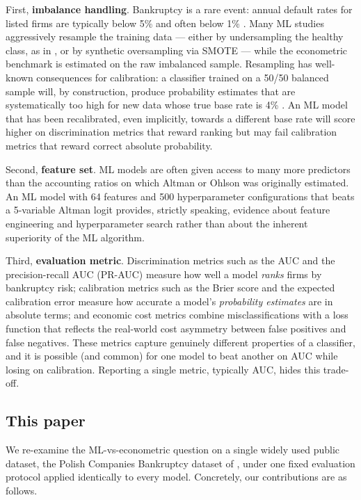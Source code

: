 \documentclass[11pt,a4paper]{article}
\begin{document}
First, \textbf{imbalance handling}. Bankruptcy is a rare event: annual
default rates for listed firms are typically below 5\% and often below 1\%
\citep{shumway2001}. Many ML studies aggressively resample the training data
--- either by undersampling the healthy class, as in \cite{pellegrino2022}, or
by synthetic oversampling via SMOTE \citep{chawla2002} --- while the
econometric benchmark is estimated on the raw imbalanced sample. Resampling
has well-known consequences for calibration: a classifier trained on a
50/50 balanced sample will, by construction, produce probability estimates
that are systematically too high for new data whose true base rate is 4\%
\citep{king2001, saerens2002}. An ML model that has been recalibrated, even
implicitly, towards a different base rate will score higher on discrimination
metrics that reward ranking but may fail calibration metrics that reward
correct absolute probability.

Second, \textbf{feature set}. ML models are often given access to many more
predictors than the accounting ratios on which Altman or Ohlson was originally
estimated. An ML model with 64 features and 500 hyperparameter configurations
that beats a 5-variable Altman logit provides, strictly speaking, evidence
about feature engineering and hyperparameter search rather than about the
inherent superiority of the ML algorithm.

Third, \textbf{evaluation metric}. Discrimination metrics such as the AUC
and the precision-recall AUC (PR-AUC) measure how well a model \emph{ranks}
firms by bankruptcy risk; calibration metrics such as the Brier score and
the expected calibration error measure how accurate a model's
\emph{probability estimates} are in absolute terms; and economic cost metrics
combine misclassifications with a loss function that reflects the real-world
cost asymmetry between false positives and false negatives. These metrics
capture genuinely different properties of a classifier, and it is possible
(and common) for one model to beat another on AUC while losing on calibration.
Reporting a single metric, typically AUC, hides this trade-off.

\subsection{This paper}

We re-examine the ML-vs-econometric question on a single widely used public
dataset, the Polish Companies Bankruptcy dataset of \cite{zieba2016}, under
one fixed evaluation protocol applied identically to every model. Concretely,
our contributions are as follows.
\end{document}
